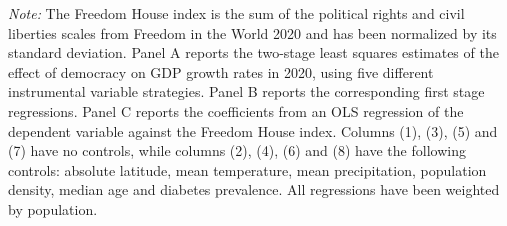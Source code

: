{\begin{table}[]
\begin{threeparttable}
\begin{tablenotes}
\item {\footnotesize {\textit{Note:}  The Freedom House index is the sum of the political rights and civil liberties scales from Freedom in the World 2020 and has been normalized by its standard deviation. Panel A reports the two-stage least squares estimates of the effect of democracy on GDP growth rates in 2020, using five different instrumental variable strategies. Panel B reports the corresponding first stage regressions. Panel C reports the coefficients from an OLS regression of the dependent variable against the Freedom House index.  Columns (1), (3), (5) and (7) have no controls, while columns (2), (4), (6) and (8) have the following controls: absolute latitude, mean temperature, mean precipitation, population density, median age and diabetes prevalence. All regressions have been weighted by population.}}
\end{tablenotes}
\end{threeparttable}
\end{table} 


\clearpage
{}
\recalctypearea
}

